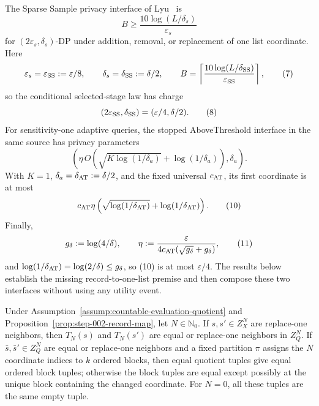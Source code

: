 The Sparse Sample privacy interface of Lyu~\citep{lyu2025} is
\[
 B\geq\frac{10\log(L/\delta_s)}{\varepsilon_s}
\tag{6}
\]
for \((2\varepsilon_s,\delta_s)\)-DP under addition, removal, or
replacement of one list coordinate.  Here
\[
 \varepsilon_s=\varepsilon_{\rm SS}:=\varepsilon/8,
 \qquad \delta_s=\delta_{\rm SS}:=\delta/2,
 \qquad
 B=\left\lceil
 \frac{10\log(L/\delta_{\rm SS})}{\varepsilon_{\rm SS}}
 \right\rceil,
\tag{7}
\]
so the conditional selected-stage law has charge
\[
 (2\varepsilon_{\rm SS},\delta_{\rm SS})
 =(\varepsilon/4,\delta/2).
\tag{8}
\]
For sensitivity-one adaptive queries, the stopped AboveThreshold interface
in the same source has privacy parameters
\[
 \left(
 \eta\,O\!\left(
   \sqrt{K\log(1/\delta_a)}+\log(1/\delta_a)
 \right),
 \delta_a
 \right).
\tag{9}
\]
With \(K=1\), \(\delta_a=\delta_{\rm AT}:=\delta/2\), and the fixed
universal \(c_{\rm AT}\), its first coordinate is at most
\[
 c_{\rm AT}\eta
 \left(\sqrt{\log(1/\delta_{\rm AT})}
       +\log(1/\delta_{\rm AT})\right).
\tag{10}
\]
Finally,
\[
 g_\delta:=\log(4/\delta),
 \qquad
 \eta:=\frac{\varepsilon}
 {4c_{\rm AT}(\sqrt{g_\delta}+g_\delta)},
\tag{11}
\]
and \(\log(1/\delta_{\rm AT})=\log(2/\delta)\le g_\delta\), so (10)
is at most \(\varepsilon/4\).  The results below establish the missing
record-to-one-list premise and then compose these two interfaces without
using any utility event.

\begin{lemma}\label{lem:step-011-record-locality}
Under Assumption~\ref{assump:countable-evaluation-quotient} and
Proposition~\ref{prop:step-002-record-map}, let \(N\in\mathbb N_0\). If
\(s,s'\in Z_X^N\) are replace-one
neighbors, then \(T_N(s)\) and \(T_N(s')\) are equal or replace-one neighbors
in \(Z_Q^N\). If \(\bar s,\bar s'\in Z_Q^N\) are equal or replace-one
neighbors and a fixed partition \(\pi\) assigns the \(N\) coordinate indices
to \(k\) ordered blocks, then equal quotient tuples give equal ordered block
tuples; otherwise the block tuples are equal except possibly at the unique
block containing the changed coordinate. For \(N=0\), all these tuples are
the same empty tuple.


\end{lemma}

